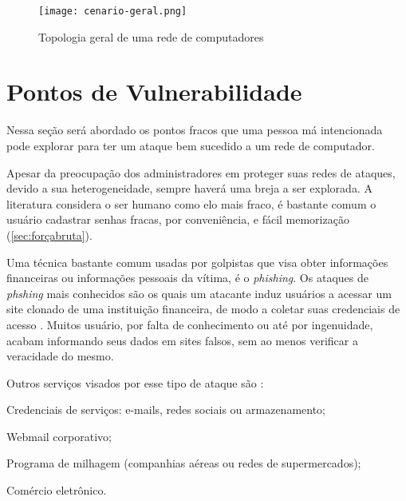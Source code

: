 \begin{figure}[!htb]
    \centering
    \caption{Topologia geral de uma rede de computadores} 
    \texttt{[image: cenario-geral.png]}
    \label{fig:cenario-geral}
\end{figure}

\section{Pontos de Vulnerabilidade} \label{sec:pontos-vulnerabilidade}

Nessa seção será abordado os pontos fracos que uma pessoa má intencionada pode explorar para ter um ataque bem sucedido a um rede de computador.

Apesar da preocupação dos administradores em proteger suas redes de ataques, devido a sua heterogeneidade, sempre haverá uma breja a ser explorada. A literatura considera o ser humano como elo mais fraco, é bastante comum o usuário cadastrar senhas fracas, por conveniência, e fácil memorização (\autoref{sec:forçabruta}).

Uma técnica bastante comum usadas por golpistas que visa obter informações financeiras ou informações pessoais da vítima, é o \textit{phishing}. Os ataques de \textit{phshing} mais conhecidos são os quais um atacante induz usuários a acessar um site clonado de uma instituição financeira, de modo a coletar suas credenciais de acesso \cite{esr:tratamento}. Muitos usuário, por falta de conhecimento ou até por ingenuidade, acabam informando seus dados em sites falsos, sem ao menos verificar a veracidade do mesmo.

Outros serviços visados por esse tipo de ataque são \cite{esr:tratamento}:
\begin{alineas}
\item Credenciais de serviços: e-mails, redes sociais ou armazenamento;
\item Webmail corporativo; 
\item Programa de milhagem (companhias aéreas ou redes de supermercados);
\item Comércio eletrônico.
\end{alineas}

